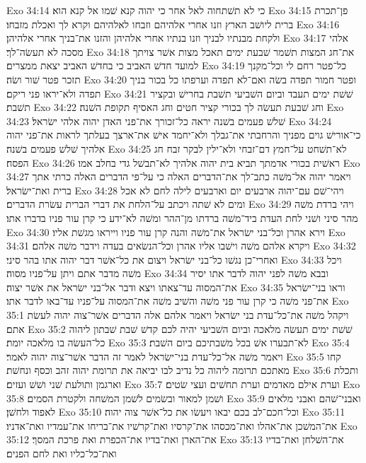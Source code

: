 Exo 34:14  כי לא תשׁתחוה לאל אחר כי יהוה קנא שׁמו אל קנא הוא׃
Exo 34:15  פן־תכרת ברית ליושׁב הארץ וזנו אחרי אלהיהם וזבחו לאלהיהם וקרא לך ואכלת מזבחו׃
Exo 34:16  ולקחת מבנתיו לבניך וזנו בנתיו אחרי אלהיהן והזנו את־בניך אחרי אלהיהן׃
Exo 34:17  אלהי מסכה לא תעשׂה־לך׃
Exo 34:18  את־חג המצות תשׁמר שׁבעת ימים תאכל מצות אשׁר צויתך למועד חדשׁ האביב כי בחדשׁ האביב יצאת ממצרים׃
Exo 34:19  כל־פטר רחם לי וכל־מקנך תזכר פטר שׁור ושׂה׃
Exo 34:20  ופטר חמור תפדה בשׂה ואם־לא תפדה וערפתו כל בכור בניך תפדה ולא־יראו פני ריקם׃
Exo 34:21  שׁשׁת ימים תעבד וביום השׁביעי תשׁבת בחרישׁ ובקציר תשׁבת׃
Exo 34:22  וחג שׁבעת תעשׂה לך בכורי קציר חטים וחג האסיף תקופת השׁנה׃
Exo 34:23  שׁלשׁ פעמים בשׁנה יראה כל־זכורך את־פני האדן יהוה אלהי ישׂראל׃
Exo 34:24  כי־אורישׁ גוים מפניך והרחבתי את־גבלך ולא־יחמד אישׁ את־ארצך בעלתך לראות את־פני יהוה אלהיך שׁלשׁ פעמים בשׁנה׃
Exo 34:25  לא־תשׁחט על־חמץ דם־זבחי ולא־ילין לבקר זבח חג הפסח׃
Exo 34:26  ראשׁית בכורי אדמתך תביא בית יהוה אלהיך לא־תבשׁל גדי בחלב אמו׃
Exo 34:27  ויאמר יהוה אל־משׁה כתב־לך את־הדברים האלה כי על־פי הדברים האלה כרתי אתך ברית ואת־ישׂראל׃
Exo 34:28  ויהי־שׁם עם־יהוה ארבעים יום וארבעים לילה לחם לא אכל ומים לא שׁתה ויכתב על־הלחת את דברי הברית עשׂרת הדברים׃
Exo 34:29  ויהי ברדת משׁה מהר סיני ושׁני לחת העדת ביד־משׁה ברדתו מן־ההר ומשׁה לא־ידע כי קרן עור פניו בדברו אתו׃
Exo 34:30  וירא אהרן וכל־בני ישׂראל את־משׁה והנה קרן עור פניו וייראו מגשׁת אליו׃
Exo 34:31  ויקרא אלהם משׁה וישׁבו אליו אהרן וכל־הנשׂאים בעדה וידבר משׁה אלהם׃
Exo 34:32  ואחרי־כן נגשׁו כל־בני ישׂראל ויצום את כל־אשׁר דבר יהוה אתו בהר סיני׃
Exo 34:33  ויכל משׁה מדבר אתם ויתן על־פניו מסוה׃
Exo 34:34  ובבא משׁה לפני יהוה לדבר אתו יסיר את־המסוה עד־צאתו ויצא ודבר אל־בני ישׂראל את אשׁר יצוה׃
Exo 34:35  וראו בני־ישׂראל את־פני משׁה כי קרן עור פני משׁה והשׁיב משׁה את־המסוה על־פניו עד־באו לדבר אתו׃
Exo 35:1  ויקהל משׁה את־כל־עדת בני ישׂראל ויאמר אלהם אלה הדברים אשׁר־צוה יהוה לעשׂת אתם׃
Exo 35:2  שׁשׁת ימים תעשׂה מלאכה וביום השׁביעי יהיה לכם קדשׁ שׁבת שׁבתון ליהוה כל־העשׂה בו מלאכה יומת׃
Exo 35:3  לא־תבערו אשׁ בכל משׁבתיכם ביום השׁבת׃
Exo 35:4  ויאמר משׁה אל־כל־עדת בני־ישׂראל לאמר זה הדבר אשׁר־צוה יהוה לאמר׃
Exo 35:5  קחו מאתכם תרומה ליהוה כל נדיב לבו יביאה את תרומת יהוה זהב וכסף ונחשׁת׃
Exo 35:6  ותכלת וארגמן ותולעת שׁני ושׁשׁ ועזים׃
Exo 35:7  וערת אילם מאדמים וערת תחשׁים ועצי שׂטים׃
Exo 35:8  ושׁמן למאור ובשׂמים לשׁמן המשׁחה ולקטרת הסמים׃
Exo 35:9  ואבני־שׁהם ואבני מלאים לאפוד ולחשׁן׃
Exo 35:10  וכל־חכם־לב בכם יבאו ויעשׂו את כל־אשׁר צוה יהוה׃
Exo 35:11  את־המשׁכן את־אהלו ואת־מכסהו את־קרסיו ואת־קרשׁיו את־בריחו את־עמדיו ואת־אדניו׃
Exo 35:12  את־הארן ואת־בדיו את־הכפרת ואת פרכת המסך׃
Exo 35:13  את־השׁלחן ואת־בדיו ואת־כל־כליו ואת לחם הפנים׃
